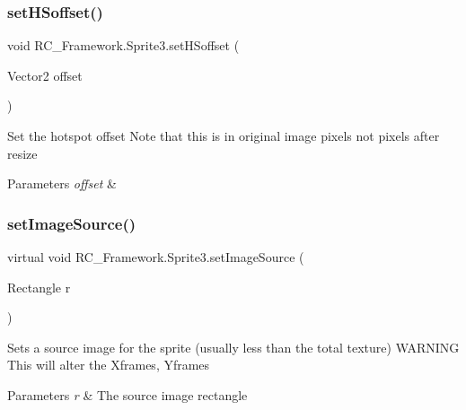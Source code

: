 \subsubsection{\texorpdfstring{set\+H\+Soffset()}{setHSoffset()}}
{\footnotesize\ttfamily void R\+C\+\_\+\+Framework.\+Sprite3.\+set\+H\+Soffset (\begin{DoxyParamCaption}\item[{Vector2}]{offset }\end{DoxyParamCaption})}



Set the hotspot offset Note that this is in original image pixels not pixels after resize 


\begin{DoxyParams}{Parameters}
{\em offset} & \\
\hline
\end{DoxyParams}
\mbox{\label{class_r_c___framework_1_1_sprite3_ac73292a1b053056aa28ecae03165c71d}} 
\subsubsection{\texorpdfstring{set\+Image\+Source()}{setImageSource()}}
{\footnotesize\ttfamily virtual void R\+C\+\_\+\+Framework.\+Sprite3.\+set\+Image\+Source (\begin{DoxyParamCaption}\item[{Rectangle}]{r }\end{DoxyParamCaption})\hspace{0.3cm}{\ttfamily [virtual]}}



Sets a source image for the sprite (usually less than the total texture) W\+A\+R\+N\+I\+NG This will alter the Xframes, Yframes 


\begin{DoxyParams}{Parameters}
{\em r} & The source image rectangle\\
\hline
\end{DoxyParams}
\mbox{\label{class_r_c___framework_1_1_sprite3_a6704e7b0ad3c2b828975cfe1c9cf73a3}} 
